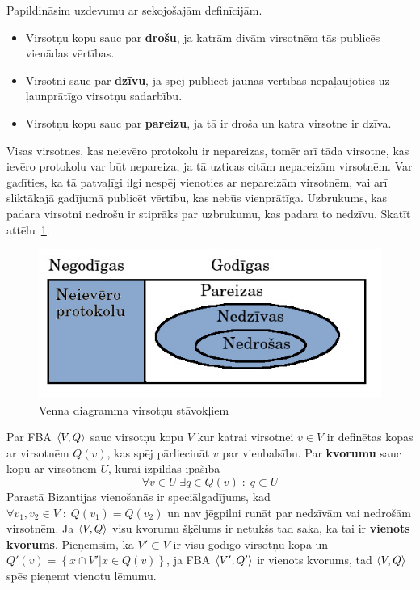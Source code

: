 Papildināsim uzdevumu ar sekojošajām definīcijām.
\begin{itemize}
    \item Virsotņu kopu sauc par \textbf{drošu}, ja katrām divām virsotnēm tās publicēs vienādas vērtības.
    \item Virsotni sauc par \textbf{dzīvu}, ja spēj publicēt jaunas vērtības nepaļaujoties uz ļaunprātīgo virsotņu sadarbību.
    \item Virsotņu kopu sauc par \textbf{pareizu}, ja tā ir droša un katra virsotne ir dzīva.
\end{itemize}
Visas virsotnes, kas neievēro protokolu ir nepareizas, tomēr arī tāda virsotne, kas ievēro protokolu var būt nepareiza, ja tā uzticas citām nepareizām virsotnēm. Var gadīties, ka tā patvaļīgi ilgi nespēj vienoties ar nepareizām virsotnēm, vai arī sliktākajā gadījumā publicēt vērtību, kas nebūs vienprātīga. Uzbrukums, kas padara virsotni nedrošu ir stiprāks par uzbrukumu, kas padara to nedzīvu. Skatīt attēlu~\ref{fig:node-fail}.
\begin{figure}[htpb]
    \centering
    \includegraphics[scale=0.5]{teorija/node-fail.jpg}
    \caption{Venna diagramma virsotņu stāvokļiem}
\label{fig:node-fail}
\end{figure}

Par FBA $\langle V,Q \rangle$ sauc virsotņu kopu $V$ kur katrai virsotnei $v\in V$ ir definētas kopas ar virsotnēm $Q(v)$, kas spēj pārliecināt $v$ par vienbalsību. Par \textbf{kvorumu} sauc kopu ar virsotnēm $U$, kurai izpildās īpašība
\begin{equation*}
    \forall v \in U \;\exists q \in Q(v) \;:\; q \subset U
\end{equation*}
Parastā Bizantijas vienošanās ir speciālgadījums, kad $\forall v_1,v_2\in V \;:\; Q(v_1) = Q(v_2)$ un nav jēgpilni runāt par nedzīvām vai nedrošām virsotnēm.
Ja $\langle V,Q \rangle$ visu kvorumu šķēlums ir netukšs tad saka, ka tai ir \textbf{vienots kvorums}. Pieņemsim, ka $V'\subset V$ ir visu godīgo virsotņu kopa un $Q'(v) = \left\{ x\cap V' | x\in Q(v) \right\}$, ja FBA $\langle V',Q' \rangle$ ir vienots kvorums, tad $\langle V,Q \rangle$ spēs pieņemt vienotu lēmumu.\cite{mazieres15}

